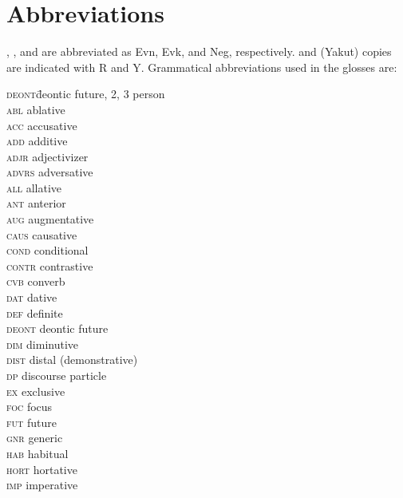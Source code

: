 \documentclass[output=paper,colorlinks,citecolor=brown]{langscibook}
\begin{document}
\section*{Abbreviations}

, , and  are abbreviated as Evn, Evk, and Neg, respectively.  and  (Yakut) copies are indicated with R and Y. Grammatical abbreviations used in the glosses are:

\begin{multicols}{2}
\begin{tabbing}
\textsc{deont}\hspace{1ex}\= deontic future, 2, 3             \> person\\
\textsc{abl}        \> ablative\\
\textsc{acc}        \> accusative\\
\textsc{add}        \> additive\\
\textsc{adjr}       \> adjectivizer\\
\textsc{advrs}      \> adversative\\
\textsc{all}        \> allative\\
\textsc{ant}        \> anterior\\
\textsc{aug}        \> augmentative\\
\textsc{caus}       \> causative\\
\textsc{cond}       \> conditional\\
\textsc{contr}      \> contrastive\\
\textsc{cvb}        \> converb\\
\textsc{dat}        \> dative\\
\textsc{def}        \> definite\\
\textsc{deont}      \> deontic future\\
\textsc{dim}        \> diminutive\\
\textsc{dist}       \> distal (demonstrative)\\
\textsc{dp}         \> discourse particle\\
\textsc{ex}         \> exclusive\\
\textsc{foc}        \> focus\\
\textsc{fut}        \> future\\
\textsc{gnr}        \> generic\\
\textsc{hab}        \> habitual\\
\textsc{hort}       \> hortative\\
\textsc{imp}        \> imperative\\

\end{tabbing}
\end{multicols}
\end{document}
